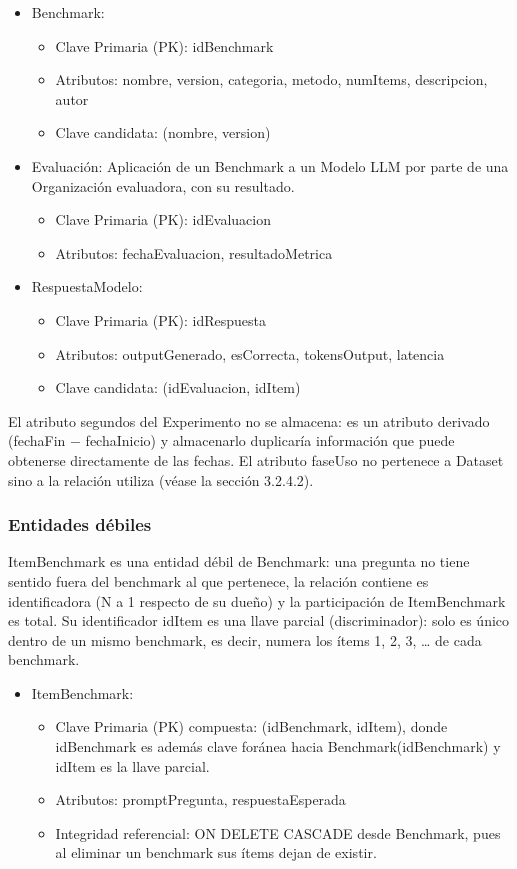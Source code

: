 \documentclass[12pt,a4paper]{article}
\begin{document}
{\begin{itemize}
  \item Benchmark:
  \begin{itemize}
  \item Clave Primaria (PK): idBenchmark
  \item Atributos: nombre, version, categoria, metodo, numItems, descripcion, autor
  \item Clave candidata: (nombre, version)
  \end{itemize}
  \item Evaluación: Aplicación de un Benchmark a un Modelo LLM por parte de una Organización evaluadora, con su resultado.
  \begin{itemize}
  \item Clave Primaria (PK): idEvaluacion
  \item Atributos: fechaEvaluacion, resultadoMetrica
  \end{itemize}
  \item RespuestaModelo:
  \begin{itemize}
  \item Clave Primaria (PK): idRespuesta
  \item Atributos: outputGenerado, esCorrecta, tokensOutput, latencia
  \item Clave candidata: (idEvaluacion, idItem)
  \end{itemize}
\end{itemize}
}

El atributo segundos del Experimento no se almacena: es un atributo derivado (fechaFin $-$ fechaInicio) y almacenarlo duplicaría información que puede obtenerse directamente de las fechas. El atributo faseUso no pertenece a Dataset sino a la relación utiliza (véase la sección 3.2.4.2).

\subsubsection{Entidades débiles}

ItemBenchmark es una entidad débil de Benchmark: una pregunta no tiene sentido fuera del benchmark al que pertenece, la relación contiene es identificadora (N a 1 respecto de su dueño) y la participación de ItemBenchmark es total. Su identificador idItem es una llave parcial (discriminador): solo es único dentro de un mismo benchmark, es decir, numera los ítems 1, 2, 3, \ldots{} de cada benchmark.
{\begin{itemize}
  \item ItemBenchmark:
  \begin{itemize}
  \item Clave Primaria (PK) compuesta: (idBenchmark, idItem), donde idBenchmark es además clave foránea hacia Benchmark(idBenchmark) y idItem es la llave parcial.
  \item Atributos: promptPregunta, respuestaEsperada
  \item Integridad referencial: ON DELETE CASCADE desde Benchmark, pues al eliminar un benchmark sus ítems dejan de existir.
  \end{itemize}
\end{itemize}
}
\end{document}
